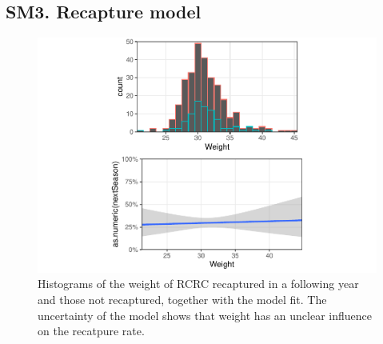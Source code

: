 \documentclass[]{interact}
\theoremstyle{plain}%
\theoremstyle{definition}
\theoremstyle{remark}
\begin{document}
\hypertarget{sm3.-recapture-model}{%
\subsection{SM3. Recapture model}\label{sm3.-recapture-model}}

\begin{figure}
\centering
\includegraphics{manuscript_files/figure-latex/unnamed-chunk-13-1.pdf}
\caption{Histograms of the weight of RCRC recaptured in a following year
and those not recaptured, together with the model fit. The uncertainty
of the model shows that weight has an unclear influence on the recatpure
rate.}
\end{figure}
\end{document}
